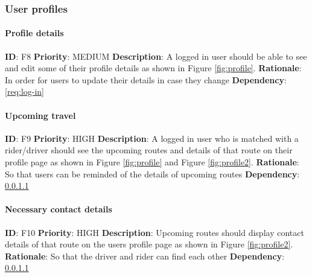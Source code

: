 \documentclass{article}
\begin{document}
\subsubsection{User profiles}

\paragraph{Profile details}\label{req:profileDetails}
\textbf{ID}: F8\newline
\textbf{Priority}: MEDIUM\newline
\textbf{Description}: A logged in user should be able to see and edit some of their profile details as shown in Figure \ref{fig:profile}. \newline
\textbf{Rationale}: In order for users to update their details in case they change\newline
\textbf{Dependency}: \ref{req:log-in}\newline

\paragraph{Upcoming travel}\label{req:upcomingTravel}
\textbf{ID}: F9\newline
\textbf{Priority}: HIGH\newline
\textbf{Description}: A logged in user who is matched with a rider/driver should see the upcoming routes and details of that route on their profile page as shown in Figure \ref{fig:profile} and Figure \ref{fig:profile2}. \newline
\textbf{Rationale}: So that users can be reminded of the details of upcoming routes\newline
\textbf{Dependency}: \ref{req:profileDetails}\newline

\paragraph{Necessary contact details}\label{req:contactDetails}
\textbf{ID}: F10\newline
\textbf{Priority}: HIGH\newline
\textbf{Description}: Upcoming routes should display contact details of that route on the users profile page as shown in Figure \ref{fig:profile2}. \newline
\textbf{Rationale}: So that the driver and rider can find each other\newline
\textbf{Dependency}: \ref{req:profileDetails}\newline
\end{document}
